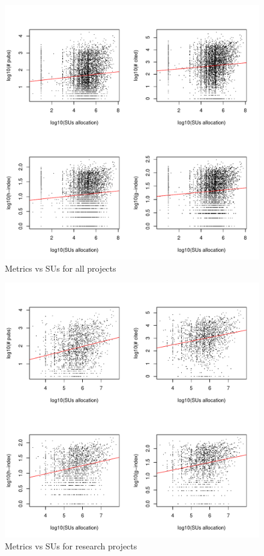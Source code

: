 \documentclass{sig-alternate}
\begin{document}
\begin{figure}[htb] 
  \centering 
    \includegraphics[width=1.0\columnwidth]{images/02_metrics_vs_alloc_proj.pdf} 
  \caption{Metrics vs SUs for all projects}\label{F:metrics-vs-alloc-proj} 
\end{figure} 
 
\begin{figure}[htb] 
  \centering 
    \includegraphics[width=1.0\columnwidth]{images/02_metrics_vs_alloc_research_proj.pdf} 
  \caption{Metrics vs SUs for research projects}\label{F:metrics-vs-alloc-research-proj} 
\end{figure} 
 
\end{document}
